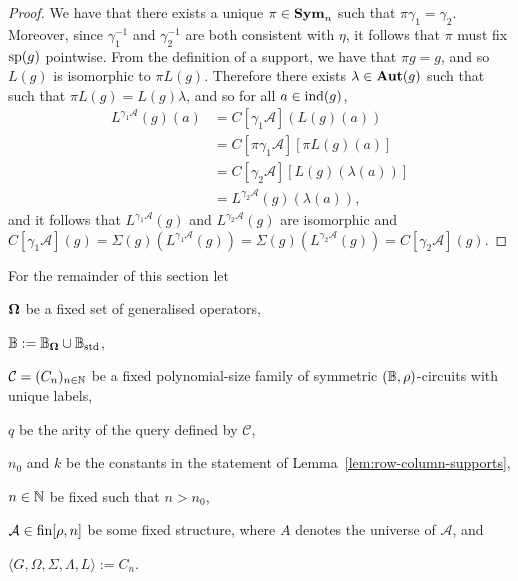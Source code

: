 \documentclass[../main/thesis.tex]{subfiles}
\begin{document}
\begin{proof}
	We have that there exists a unique $\pi \in \text{\textbf{Sym}}_n$ such that $\pi \gamma_1 =
  \gamma_2$. Moreover, since $\gamma^{-1}_1$ and $\gamma^{-1}_2$ are both
  consistent with $\eta$, it follows that $\pi$ must fix $\text{sp}(g)$ pointwise.
  From the definition of a support, we have that $\pi g = g$, and so $L(g)$ is
  isomorphic to $\pi L(g)$. Therefore there exists $\lambda \in \text{\textbf{Aut}}(g)$ such
  that such that $\pi L(g) = L(g) \lambda$, and so for all $a \in \text{\upshape ind}(g)$,
	\begin{align*}
		L^{\gamma_1 \mathcal{A}}(g) (a) & = C[\gamma_1 \mathcal{A}](L(g)(a))                    \\
                                    & = C[\pi \gamma_1 \mathcal{A}][\pi L(g)(a)]            \\
                                    & = C[\gamma_2 \mathcal{A}][L(g)(\lambda(a))] \\
                                    & = L^{\gamma_2 \mathcal{A}}(g) (\lambda (a)),                 
	\end{align*}
	and it follows that $L^{\gamma_1 \mathcal{A}}(g)$ and $L^{\gamma_2
    \mathcal{A}}(g)$ are isomorphic and $C[\gamma_1 \mathcal{A}](g) = \Sigma(g)
  (L^{\gamma_1 \mathcal{A}}(g)) = \Sigma(g) (L^{\gamma_2 \mathcal{A}}(g)) =
  C[\gamma_2 \mathcal{A}](g)$.
\end{proof}

For the remainder of this section let
\begin{myitemize}
\item $\mathbf{\mathbf{\Omega}}$ be a fixed set of generalised operators,
\item $\mathbb{B} := \mathbb{B}_{\mathbf{\mathbf{\Omega}}} \cup \mathbb{B}_{\text{std}}$,
\item $\mathcal{C} = (C_n)_{n \in \mathbb{N}}$ be a fixed polynomial-size family of
  symmetric $(\mathbb{B},\rho)$-circuits with unique labels,
\item $q$ be the arity of the query defined by $\mathcal{C}$,
\item $n_0$ and $k$ be the constants in the statement of
  Lemma~\ref{lem:row-column-supports},

\item $n \in \mathbb{N}$ be fixed such that $n > n_0$,
\item $\mathcal{A} \in \text{\upshape fin}{[\rho, n]}$ be some fixed structure, where $A$ denotes
  the universe of $\mathcal{A}$, and
\item $\langle G, \Omega, \Sigma, \Lambda, L \rangle := C_n$.
\end{myitemize}
\end{document}
